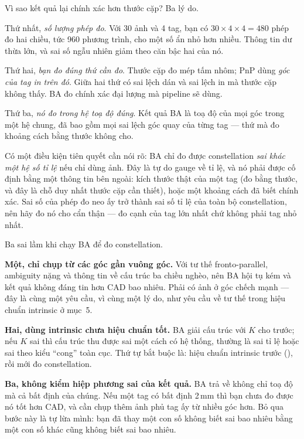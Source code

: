 \documentclass[../../marker.tex]{subfiles}
\begin{document}
Vì sao kết quả lại chính xác hơn thước cặp? Ba lý do.

Thứ nhất, \emph{số lượng phép đo}. Với 30 ảnh và 4 tag, bạn có \(30 \times 4 \times 4 = 480\) phép đo hai chiều, tức 960 phương trình, cho một số ẩn nhỏ hơn nhiều. Thông tin dư thừa lớn, và sai số ngẫu nhiên giảm theo căn bậc hai của nó.

Thứ hai, \emph{bạn đo đúng thứ cần đo}. Thước cặp đo mép tấm nhôm; PnP dùng \emph{góc của tag in trên đó}. Giữa hai thứ có sai lệch dán và sai lệch in mà thước cặp không thấy. BA đo chính xác đại lượng mà pipeline sẽ dùng.

Thứ ba, \emph{nó đo trong hệ toạ độ đúng}. Kết quả BA là toạ độ của mọi góc trong một hệ chung, đã bao gồm mọi sai lệch góc quay của từng tag --- thứ mà đo khoảng cách bằng thước không cho.

Có một điều kiện tiên quyết cần nói rõ: BA chỉ đo được constellation \emph{sai khác một hệ số tỉ lệ} nếu chỉ dùng ảnh. Đây là tự do gauge về tỉ lệ, và nó phải được cố định bằng một thông tin bên ngoài: kích thước thật của một tag (đo bằng thước, và đây là chỗ duy nhất thước cặp cần thiết), hoặc một khoảng cách đã biết chính xác. Sai số của phép đo neo ấy trở thành sai số tỉ lệ của toàn bộ constellation, nên hãy đo nó cho cẩn thận --- đo cạnh của tag lớn nhất chứ không phải tag nhỏ nhất.

\begin{cambay}
Ba sai lầm khi chạy BA để đo constellation.

\textbf{Một, chỉ chụp từ các góc gần vuông góc.} Với tư thế fronto-parallel, ambiguity nặng và thông tin về cấu trúc ba chiều nghèo, nên BA hội tụ kém và kết quả không đáng tin hơn CAD bao nhiêu. Phải có ảnh ở góc chếch mạnh --- đây là cùng một yêu cầu, vì cùng một lý do, như yêu cầu về tư thế trong hiệu chuẩn intrinsic ở  mục~5.

\textbf{Hai, dùng intrinsic chưa hiệu chuẩn tốt.} BA giải cấu trúc với \(K\) cho trước; nếu \(K\) sai thì cấu trúc thu được sai một cách có hệ thống, thường là sai tỉ lệ hoặc sai theo kiểu ``cong'' toàn cục. Thứ tự bắt buộc là: hiệu chuẩn intrinsic trước (), rồi mới đo constellation.

\textbf{Ba, không kiểm hiệp phương sai của kết quả.} BA trả về không chỉ toạ độ mà cả bất định của chúng. Nếu một tag có bất định 2\,mm thì bạn chưa đo được nó tốt hơn CAD, và cần chụp thêm ảnh phủ tag ấy từ nhiều góc hơn. Bỏ qua bước này là tự lừa mình: bạn đã thay một con số không biết sai bao nhiêu bằng một con số khác cũng không biết sai bao nhiêu.
\end{cambay}
\end{document}

